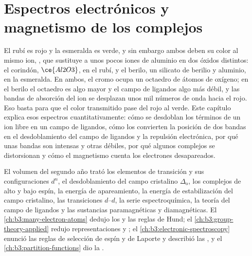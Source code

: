 \chapter{Espectros electrónicos y magnetismo de los complejos}\label{ch:b3:complex-spectra-magnetism}

El rubí es rojo y la esmeralda es verde, y sin embargo ambos deben su color al mismo ion,
, que sustituye a unos pocos iones de aluminio en dos óxidos distintos: el corindón,
$\ce{Al2O3}$, en el rubí, y el berilo, un silicato de berilio y aluminio, en la esmeralda. En
ambos, el cromo ocupa un octaedro de átomos de oxígeno; en el berilo el
octaedro es algo mayor y el campo de ligandos algo más débil, y las
bandas de absorción del ion se desplazan unos mil números de onda hacia el rojo.
Eso basta para que el color transmitido pase del rojo al verde. Este capítulo
explica esos espectros cuantitativamente: cómo se desdoblan los términos de un ion libre en un
campo de ligandos, cómo los  convierten la posición de dos bandas en el
desdoblamiento del campo de ligandos y la repulsión electrónica, por qué unas bandas son intensas
y otras débiles, por qué algunos complejos se distorsionan y cómo el magnetismo cuenta los
electrones desapareados.

\begin{recall}
El volumen del segundo año trató los elementos de transición y sus configuraciones $d^n$, el
desdoblamiento del campo cristalino $\Delta_{\mathrm o}$, los complejos de alto y bajo espín, la energía de apareamiento,
la energía de estabilización del campo cristalino, las transiciones $d$--$d$, la serie espectroquímica,
la teoría del campo de ligandos y las sustancias paramagnéticas y diamagnéticas.
El \cref{ch:b3:many-electron-atoms} dedujo los  y las reglas de Hund;
el \cref{ch:b3:group-theory-applied} redujo representaciones y ;
el \cref{ch:b3:electronic-spectroscopy} enunció las reglas de selección de espín y de Laporte
y describió las , y
el \cref{ch:b3:partition-functions} dio la .
\end{recall}

